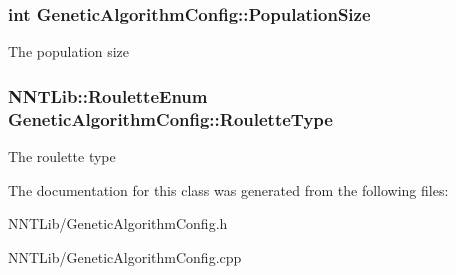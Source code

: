 \subsubsection[{Population\+Size}]{\setlength{\rightskip}{0pt plus 5cm}int Genetic\+Algorithm\+Config\+::\+Population\+Size}\label{class_genetic_algorithm_config_a8e8f286ff257bb31ab7c4a64963be30b}


The population size 

\hypertarget{class_genetic_algorithm_config_abe0badd59b500a67a8179ca83bd7fea9}{}
\subsubsection[{Roulette\+Type}]{\setlength{\rightskip}{0pt plus 5cm}N\+N\+T\+Lib\+::\+Roulette\+Enum Genetic\+Algorithm\+Config\+::\+Roulette\+Type}\label{class_genetic_algorithm_config_abe0badd59b500a67a8179ca83bd7fea9}


The roulette type 



The documentation for this class was generated from the following files\+:\begin{DoxyCompactItemize}
\item 
N\+N\+T\+Lib/Genetic\+Algorithm\+Config.\+h\item 
N\+N\+T\+Lib/Genetic\+Algorithm\+Config.\+cpp\end{DoxyCompactItemize}
